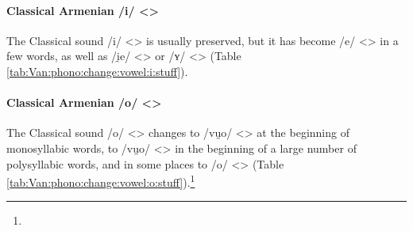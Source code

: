 \paragraph{Classical Armenian /i/ <>} 

The Classical sound /i/ <> is usually preserved, but it has become /e/ <> in a few words, as well as /i̯e/ <> or /ʏ/ <> (Table \ref{tab:Van:phono:change:vowel:i:stuff}).

\begin{table}[H]
	\centering
	\caption{Change from Classical Armenian /i/ <> to /i, e, i̯e, ʏ/ <> in the Van dialect}
	\label{tab:Van:phono:change:vowel:i:stuff}
\end{table} 

\paragraph{Classical Armenian /o/ <>} 

The Classical sound /o/ <> changes to /vu̯o/ <> at the beginning of monosyllabic words, to /vu̯o/ <> in the beginning of a large number of polysyllabic words, and in some places to /o/ <> (Table \ref{tab:Van:phono:change:vowel:o:stuff}).\footnote{}

